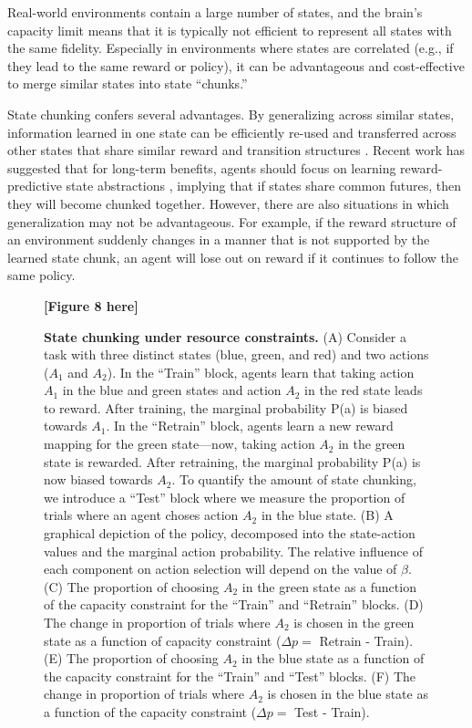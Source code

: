 \documentclass[11pt]{article}
\begin{document}
Real-world environments contain a large number of states, and the brain's capacity limit means that it is typically not efficient to represent all states with the same fidelity. Especially in environments where states are correlated (e.g., if they lead to the same reward or policy), it can be advantageous and cost-effective to merge similar states into state ``chunks.''

State chunking confers several advantages. By generalizing across similar states, information learned in one state can be efficiently re-used and transferred across other states that share similar reward and transition structures \citep{Abel2019-hr,Lehnert2019-kz,tomov20,Lehnert2020-nv}. Recent work has suggested that for long-term benefits, agents should focus on learning reward-predictive state abstractions \citep{Lehnert2019-kz,Lehnert2020-nv}, implying that if states share common futures, then they will become chunked together. However, there are also situations in which generalization may not be advantageous. For example, if the reward structure of an environment suddenly changes in a manner that is not supported by the learned state chunk, an agent will lose out on reward if it continues to follow the same policy. 

\begin{figure}
    \centering
    \textbf{[Figure 8 here]}
            \caption{\textbf{State chunking under resource constraints.} (A) Consider a task with three distinct states (blue, green, and red) and two actions ($A_1$ and $A_2$). In the ``Train'' block, agents learn that taking action $A_1$ in the blue and green states and action $A_2$ in the red state leads to reward. After training, the marginal probability P(a) is biased towards $A_1$. In the ``Retrain'' block, agents learn a new reward mapping for the green state---now, taking action $A_2$ in the green state is rewarded. After retraining, the marginal probability P(a) is now biased towards $A_2$. To quantify the amount of state chunking, we introduce a ``Test'' block where we measure the proportion of trials where an agent choses action $A_2$ in the blue state. (B) A graphical depiction of the policy, decomposed into the state-action values and the marginal action probability. The relative influence of each component on action selection will depend on the value of $\beta$. (C) The proportion of choosing $A_2$ in the green state as a function of the capacity constraint for the ``Train'' and ``Retrain'' blocks. (D) The change in proportion of trials where $A_2$ is chosen in the green state as a function of capacity constraint ($\Delta p = $ Retrain - Train). (E) The proportion of choosing $A_2$ in the blue state as a function of the capacity constraint for the ``Train'' and ``Test'' blocks. (F) The change in proportion of trials where $A_2$ is chosen in the blue state as a function of the capacity constraint ($\Delta p = $ Test - Train).}
    \label{fig:sc1}
\end{figure}
\end{document}
